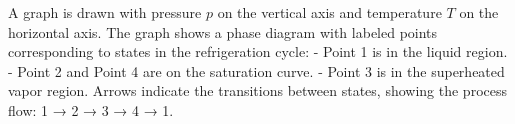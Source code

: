 A graph is drawn with pressure \( p \) on the vertical axis and temperature \( T \) on the horizontal axis. The graph shows a phase diagram with labeled points corresponding to states in the refrigeration cycle:  
- Point 1 is in the liquid region.  
- Point 2 and Point 4 are on the saturation curve.  
- Point 3 is in the superheated vapor region.  
Arrows indicate the transitions between states, showing the process flow:  
1 → 2 → 3 → 4 → 1.